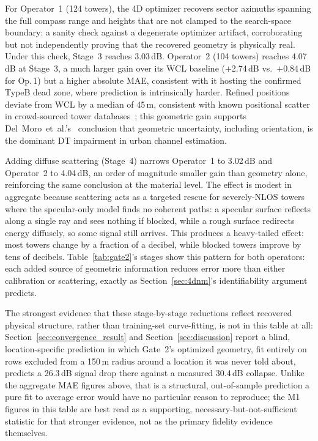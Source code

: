 \documentclass[conference]{IEEEtran}
\begin{document}
For Operator~1 (124 towers), the 4D optimizer recovers sector azimuths
spanning the full compass range and heights that are not clamped to the
search-space boundary: a sanity check against a degenerate optimizer
artifact, corroborating but not independently proving that the
recovered geometry is physically real. Under this check, Stage~3
reaches 3.03\,dB. Operator~2 (104 towers) reaches 4.07\,dB at
Stage~3, a much larger gain over its WCL baseline ($+$2.74\,dB vs.\
$+$0.84\,dB for Op.\,1) but a higher absolute MAE, consistent with it
hosting the confirmed TypeB dead zone, where prediction is intrinsically
harder. Refined positions deviate from WCL by a median of 45\,m,
consistent with known positional scatter in crowd-sourced tower
databases~\cite{del2017survey}; this geometric gain supports
Del~Moro~et~al.'s~\cite{delmoro2025dt} conclusion that geometric
uncertainty, including orientation, is the dominant DT impairment in
urban channel estimation.

Adding diffuse scattering (Stage~4) narrows Operator~1 to 3.02\,dB and
Operator~2 to 4.04\,dB, an order of magnitude smaller gain than
geometry alone, reinforcing the same conclusion at the material level.
The effect is modest in aggregate because scattering acts as a targeted
rescue for severely-NLOS towers where the specular-only model finds no
coherent paths: a specular surface reflects along a single ray and
sees nothing if blocked, while a rough surface redirects energy
diffusely, so some signal still arrives. This produces a heavy-tailed
effect: most towers change by a fraction of a decibel, while blocked
towers improve by tens of decibels. Table~\ref{tab:gate2}'s stages
show this pattern for both operators: each added source of geometric
information reduces error more than either calibration or scattering,
exactly as Section~\ref{sec:4dnm}'s identifiability argument predicts.

The strongest evidence that these stage-by-stage reductions reflect
recovered physical structure, rather than training-set curve-fitting, is
not in this table at all: Section~\ref{sec:convergence_result} and
Section~\ref{sec:discussion} report a blind, location-specific
prediction in which Gate~2's optimized geometry, fit entirely on rows
excluded from a 150\,m radius around a location it was never told
about, predicts a 26.3\,dB signal drop there against a measured
30.4\,dB collapse. Unlike the aggregate MAE figures above, that is a
structural, out-of-sample prediction a pure fit to average error would
have no particular reason to reproduce; the M1 figures in this table
are best read as a supporting, necessary-but-not-sufficient statistic
for that stronger evidence, not as the primary fidelity evidence
themselves.
\end{document}
